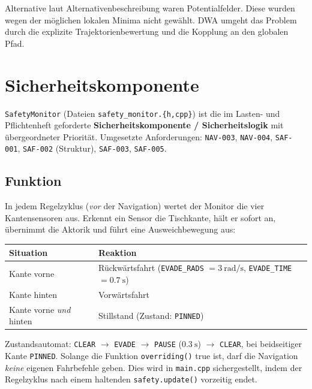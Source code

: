 \documentclass[
  a4paper,
  12pt,
  DIV=12,        %
  parskip=half,  %
  headings=small %
]{scrartcl}
\theoremstyle{definition}
\theoremstyle{definition}
\begin{document}
Alternative laut Alternativenbeschreibung waren Potentialfelder. Diese
wurden wegen der möglichen lokalen Minima nicht gewählt. DWA umgeht das
Problem durch die explizite Trajektorienbewertung und die Kopplung an
den globalen Pfad.

\section{Sicherheitskomponente}\label{sicherheitskomponente}

\texttt{SafetyMonitor} (Dateien \texttt{safety\_monitor.\{h,cpp\}}) ist
die im Lasten- und Pflichtenheft geforderte \textbf{Sicherheitskomponente
/ Sicherheitslogik} mit übergeordneter Priorität. Umgesetzte
Anforderungen: \texttt{NAV-003}, \texttt{NAV-004}, \texttt{SAF-001},
\texttt{SAF-002} (Struktur), \texttt{SAF-003}, \texttt{SAF-005}.

\subsection{Funktion}\label{safety-funktion}

In jedem Regelzyklus (\emph{vor} der Navigation) wertet der Monitor
die vier Kantensensoren aus. Erkennt ein Sensor die Tischkante, hält er
sofort an, übernimmt die Aktorik und führt eine Ausweichbewegung aus:

\begin{longtable}[]{@{}p{}p{}@{}}
\toprule
\textbf{Situation} & \textbf{Reaktion}\\
\midrule
\endhead
Kante vorne & Rückwärtsfahrt (\texttt{EVADE\_RADS} $= \SI{3}{\radian\per\second}$, \texttt{EVADE\_TIME} $= \SI{0.7}{\second}$)\\
Kante hinten & Vorwärtsfahrt\\
Kante vorne \emph{und} hinten & Stillstand (Zustand: \texttt{PINNED})\\
\bottomrule
\end{longtable}

Zustandsautomat: \texttt{CLEAR} $\to$ \texttt{EVADE} $\to$ \texttt{PAUSE}
($\SI{0.3}{\second}$) $\to$ \texttt{CLEAR}, bei beidseitiger Kante
\texttt{PINNED}. Solange die Funktion \texttt{overriding()} true ist, darf die
Navigation \emph{keine} eigenen Fahrbefehle geben. Dies wird in
\texttt{main.cpp} sichergestellt, indem der Regelzyklus nach einem
haltenden \texttt{safety.update()} vorzeitig endet.
\end{document}
